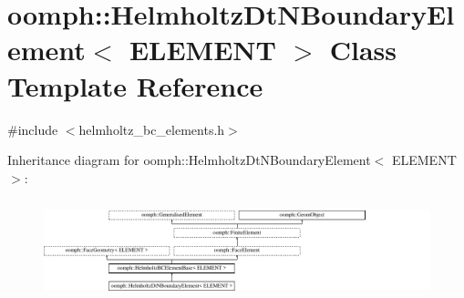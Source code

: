 \hypertarget{classoomph_1_1HelmholtzDtNBoundaryElement}{}\section{oomph\+:\+:Helmholtz\+Dt\+N\+Boundary\+Element$<$ E\+L\+E\+M\+E\+NT $>$ Class Template Reference}
\label{classoomph_1_1HelmholtzDtNBoundaryElement}


{\ttfamily \#include $<$helmholtz\+\_\+bc\+\_\+elements.\+h$>$}

Inheritance diagram for oomph\+:\+:Helmholtz\+Dt\+N\+Boundary\+Element$<$ E\+L\+E\+M\+E\+NT $>$\+:\begin{figure}[H]
\begin{center}
\leavevmode
\includegraphics[height=2.925810cm]{classoomph_1_1HelmholtzDtNBoundaryElement}
\end{center}
\end{figure}
